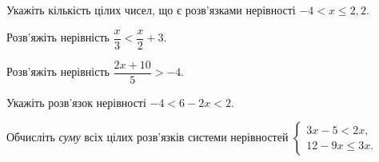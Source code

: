 \documentclass[12pt]{article}
\begin{document}
\begin{samepage}
\noindent\zadnum Укажіть кількість цілих чисел, що є розв'язками нерівності $-4 < x \leqslant 2{,}2$. 
\par{}
\end{samepage}

\begin{samepage}
\noindent\zadnum Розв'яжіть нерівність $\dfrac{x}{3} < \dfrac{x}{2} + 3$. 
\par{}
\end{samepage}

\begin{samepage}
\noindent\zadnum Розв'яжіть нерівність $\dfrac{2x + 10}{5} > -4$. 
\par{}
\end{samepage}

\begin{samepage}
\noindent\zadnum Укажіть розв'язок нерівності $-4 < 6 - 2x < 2$. 
\par{}
\end{samepage}

\begin{samepage}
\noindent\zadnum Обчисліть \textit{суму} всіх цілих розв'язків системи нерівностей $\begin{cases} 3x - 5 < 2x, \\ 12 - 9x \leqslant 3x. \end{cases}$ 
\par{}
\end{samepage}

\begin{samepage}
\ifshowsolutions{}\fi
\par{}
\end{samepage}
\end{document}

